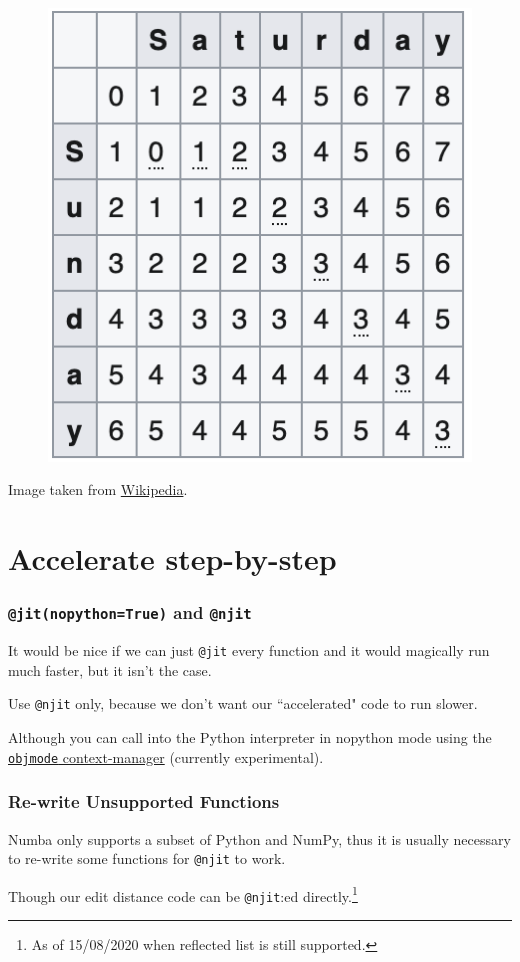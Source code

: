 \documentclass{beamer}
\newcommand{\icode}[1]{\texttt{#1}}  %
\begin{document}
\begin{frame}
\begin{figure}
\includegraphics[width=.5\textwidth]{edit-dist}
\end{figure}
\footnotesize Image taken from \href{https://en.wikipedia.org/wiki/Levenshtein_distance}{Wikipedia}.
\end{frame}

\section{Accelerate step-by-step}
\begin{frame}
\frametitle{\icode{@jit(nopython=True)} and \icode{@njit}}
It would be nice if we can just \icode{@jit} every function and it would magically run much faster, but it isn't the case. \vspace*{0.3cm}\pause

Use \icode{@njit} only, because we don't want our ``accelerated" code to run slower. \vspace*{0.3cm}\pause

Although you can call into the Python interpreter in nopython mode using the \href{https://numba.pydata.org/numba-doc/latest/user/withobjmode.html?highlight=interpreter}{\icode{objmode} context-manager} (currently experimental).
\end{frame}

\begin{frame}
\frametitle{Re-write Unsupported Functions}
Numba only supports a subset of Python and NumPy, thus it is usually necessary to re-write some functions for \icode{@njit} to work. \vspace*{0.3cm} \pause

Though our edit distance code can be \icode{@njit}:ed directly.\footnote{As of 15/08/2020 when reflected list is still supported.}
\end{frame}
\end{document}
